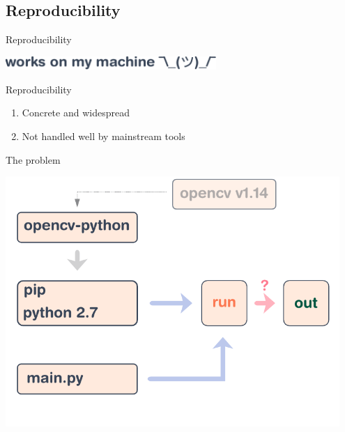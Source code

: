 \documentclass[a4paper]{beamer}
\begin{document}
\subsection{Reproducibility}

\begin{frame}{Reproducibility}
    \begin{center}
        \includegraphics[width=0.6\textwidth]{img/works-on-my-machine.pdf}
    \end{center}

    \vspace{10pt}

     {
    \begin{alertblock}{Reproducibility}
    \begin{enumerate}
        \item<3-> Concrete and widespread
        \item<4-> Not handled well by mainstream tools
    \end{enumerate}
    \end{alertblock}
}
\end{frame}

\begin{frame}{The problem}
    \begin{center}
        \includegraphics[width=0.95\textwidth]{img/schema-build.pdf}
    \end{center}
\end{frame}
\end{document}
